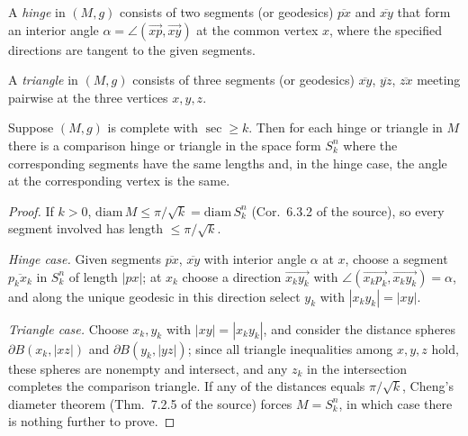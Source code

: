\begin{definition}[hinge]
  \label{def:pet-ch12-hinge}
  A \emph{hinge} in $(M,g)$ consists of two segments (or geodesics)
  $\overline{px}$ and $\overline{xy}$ that form an interior angle
  $\alpha=\angle(\overrightarrow{xp},\overrightarrow{xy})$ at the common vertex
  $x$, where the specified directions are tangent to the given segments.
\end{definition}

\begin{definition}[triangle]
  \label{def:pet-ch12-triangle}
  A \emph{triangle} in $(M,g)$ consists of three segments (or geodesics)
  $\overline{xy}$, $\overline{yz}$, $\overline{zx}$ meeting pairwise at the three
  vertices $x,y,z$.
\end{definition}

\begin{lemma}
  \label{lem:pet-ch12-comparison-hinge-triangle-exist}
  Suppose $(M,g)$ is complete with $\sec\ge k$. Then for each hinge or triangle
  in $M$ there is a comparison hinge or triangle in the space form $S_k^n$ where
  the corresponding segments have the same lengths and, in the hinge case, the
  angle at the corresponding vertex is the same.
\end{lemma}
\begin{proof}
  If $k>0$, $\mathrm{diam}\,M\le\pi/\sqrt k=\mathrm{diam}\,S_k^n$ (Cor.\ 6.3.2 of the
  source), so every segment involved has length $\le\pi/\sqrt k$.

  \emph{Hinge case.} Given segments $\overline{px}$, $\overline{xy}$ with interior
  angle $\alpha$ at $x$, choose a segment $\overline{p_kx_k}$ in $S_k^n$ of length
  $|px|$; at $x_k$ choose a direction $\overrightarrow{x_ky_k}$ with
  $\angle(\overrightarrow{x_kp_k},\overrightarrow{x_ky_k})=\alpha$, and along the
  unique geodesic in this direction select $y_k$ with $|x_ky_k|=|xy|$.

  \emph{Triangle case.} Choose $x_k,y_k$ with $|xy|=|x_ky_k|$, and consider the
  distance spheres $\partial B(x_k,|xz|)$ and $\partial B(y_k,|yz|)$; since all
  triangle inequalities among $x,y,z$ hold, these spheres are nonempty and
  intersect, and any $z_k$ in the intersection completes the comparison triangle.
  If any of the distances equals $\pi/\sqrt k$, Cheng's diameter theorem
  (Thm.\ 7.2.5 of the source) forces $M=S_k^n$, in which case there is nothing
  further to prove.
\end{proof}


